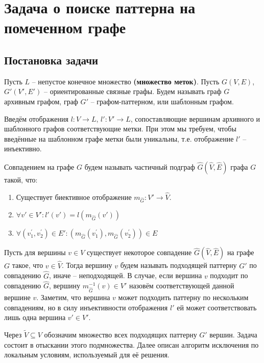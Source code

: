 \section{Задача о поиске паттерна на помеченном графе}

\subsection{Постановка задачи}
\par Пусть $L$ -- непустое конечное множество \textbf{(множество меток)}. Пусть $G(V, E)$, $G'(V', E')$ -- ориентированные связные графы. Будем называть граф $G$ архивным графом, граф $G'$ -- графом-паттерном, или шаблонным графом.

Введём отображения $l : V \to L$, $l' : V' \to L$, сопоставляющие вершинам архивного и шаблонного графов соответствующие метки. При этом мы требуем, чтобы введённые на шаблонном графе метки были уникальны, т.е. отображение $l'$ -- инъективно.

\begin{defn}
	Совпадением на графе $G$ будем называть частичный подграф $\widehat{G}(\widehat{V}, \widehat{E})$ графа $G$ такой, что:
	\begin{enumerate}
		\item Существует биективное отображение $m_{\widehat{G}}: V' \to \widehat{V}$.
		\item $\forall v' \in V': l'(v') = l(m_{\widehat{G}}(v'))$
		\item $\forall (v^{\prime}_1, v^{\prime}_2) \in E': (m_{\widehat{G}}(v^{\prime}_1), m_{\widehat{G}}(v^{\prime}_2)) \in E$
	\end{enumerate}
\end{defn} 

Пусть для вершины $v \in V$ существует некоторое совпадение  $\widehat{G}(\widehat{V}, \widehat{E})$ на графе $G$ такое, что $v \in \widehat{V}$. Тогда вершину $v$ будем называть подходящей паттерну $G'$ по совпадению $\widehat{G}$, иначе -- неподходящей. В случае, если вершина $v$ подходит по совпадению $\widehat{G}$, вершину $m_{\widehat{G}}^{-1}(v) \in  V'$ назовём соответствующей данной вершине $v$. Заметим, что вершина $v$ может подходить паттерну по нескольким совпадениям, но в силу инъективности отображения $l'$ ей может соответствовать лишь одна вершина $v' \in  V'$.

Через $\widetilde{V} \subseteq V$ обозначим множество всех подходящих паттерну $G'$ вершин. Задача состоит в отыскании этого подмножества. Далее описан алгоритм исключения по локальным условиям, используемый для её решения.

